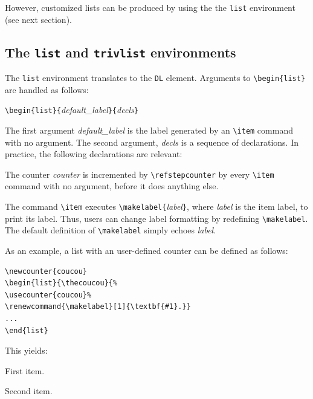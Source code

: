 However, customized lists can be produced by using the
the \texttt{list} environment (see next section).


\subsection{The \protect\texttt{list} and \protect\texttt{trivlist}
environments}
The \verb+list+ environment translates to the
\verb+DL+ element.
Arguments to \verb+\begin{list}+ are handled as follows:

\begin{flushleft}
\quad\verb+\begin{list}{+{\it default\_label}\verb+}{+{\it decls}\verb+}+
\end{flushleft}

The first argument {\it default\_label} is the label generated by an
\verb+\item+ command with no argument.
The second argument, {\it decls} is a sequence of declarations.
In practice, the following declarations are relevant:
\begin{list}{}{}
\item[\texttt{\char92 usecounter\{}\textit{counter}\texttt{\}}]
The counter {\it counter} is incremented by \verb+\refstepcounter+
by every \verb+\item+ command with no argument, before it does
anything else.
\item[\texttt{\char92 renewcommand\{\char92
makelabel\}[1]\{}\ldots\texttt{\}}]
The command \verb+\item+ executes
\verb+\makelabel{+{\it label}\verb+}+, where {\it label} is the item
label, to print its label.
Thus, users can change label formatting by redefining
\verb+\makelabel+.
The default definition of \verb+\makelabel+ simply echoes \textit{label}.
\end{list}

As an example, a list with an user-defined counter can be defined as
follows:
\begin{verbatim}
\newcounter{coucou}
\begin{list}{\thecoucou}{%
\usecounter{coucou}%
\renewcommand{\makelabel}[1]{\textbf{#1}.}}
...
\end{list}
\end{verbatim}
This yields:
\begin{list}
  {\thecoucou}
  {\renewcommand{\makelabel}[1]{\textbf{#1}.}}
\item First item.
\item Second item.
\end{list}

